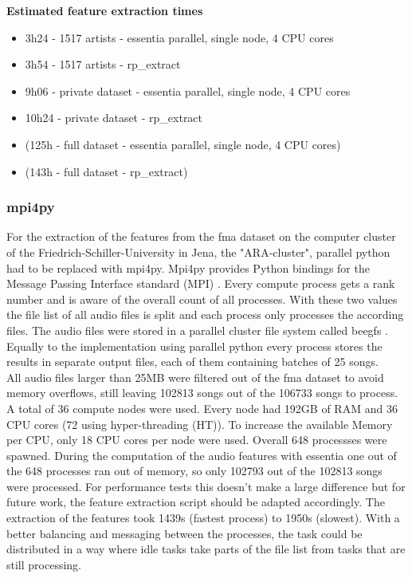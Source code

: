 \textbf{Estimated feature extraction times}
\begin{itemize}
	\setlength\itemsep{-0.5em}
	\item 3h24 - 1517 artists - essentia parallel, single node, 4 CPU cores
	\item 3h54 - 1517 artists - rp\_extract
	\item 9h06 - private dataset - essentia parallel, single node, 4 CPU cores
	\item 10h24 - private dataset - rp\_extract
	\item (125h - full dataset - essentia parallel, single node, 4 CPU cores)
	\item (143h - full dataset - rp\_extract)
\end{itemize}

\subsubsection{mpi4py}

For the extraction of the features from the fma dataset on the computer cluster of the Friedrich-Schiller-University in Jena, the "ARA-cluster", parallel python had to be replaced with mpi4py. 
Mpi4py provides Python bindings for the Message Passing Interface standard (MPI) \cite{mpi4py}. 
Every compute process gets a rank number and is aware of the overall count of all processes. With these two values the file list of all audio files is split and each process only processes the according files. The audio files were stored in a parallel cluster file system called beegfs \cite{beegfs}. Equally to the implementation using parallel python every process stores the results in separate output files, each of them containing batches of 25 songs.\\
All audio files larger than 25MB were filtered out of the fma dataset to avoid memory overflows, still leaving 102813 songs out of the 106733 songs to process. A total of 36 compute nodes were used. Every node had 192GB of RAM and 36 CPU cores (72 using hyper-threading (HT)). To increase the available Memory per CPU, only 18 CPU cores per node were used. Overall 648 processses were spawned. During the computation of the audio features with essentia one out of the 648 processes ran out of memory, so only 102793 out of the 102813 songs were processed. For performance tests this doesn't make a large difference but for future work, the feature extraction script should be adapted accordingly. 
The extraction of the features took 1439s (fastest process) to 1950s (slowest). With a better balancing and messaging between the processes, the task could be distributed in a way where idle tasks take parts of the file list from tasks that are still processing. 

